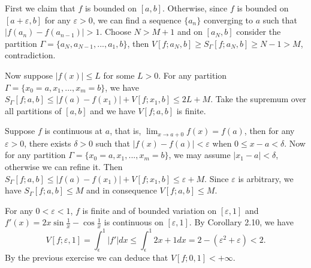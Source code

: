 \begin{exercise}{2.5}
  First we claim that $f$ is bounded on $[a,b]$.
  Otherwise, since $f$ is bounded on $[a+\varepsilon,b]$ for any $\varepsilon>0$,
  we can find a sequence $\{a_n\}$ converging to $a$ such that $|f(a_n)-f(a_{n-1})|>1$.
  Choose $N>M+1$ and on $[a_N,b]$ consider the partition $\Gamma=\{a_N,a_{N-1},...,a_1,b\}$,
  then $V[f;a_N,b]\geq S_{\Gamma}[f;a_N,b]\geq N-1>M$, contradiction.

  Now suppose $|f(x)|\leq L$ for some $L>0$.
  For any partition $\Gamma=\{x_0=a,x_1,...,x_m=b\}$,
  we have $S_{\Gamma}[f;a,b]\leq |f(a)-f(x_1)|+V[f;x_1,b]\leq 2L+M$.
  Take the supremum over all partitions of $[a,b]$ and we have $V[f;a,b]$ is finite.

  Suppose $f$ is continuous at $a$, that is, $\lim_{x\rightarrow{a+0}}f(x)=f(a)$,
  then for any $\varepsilon>0$,
  there exists $\delta>0$ such that $|f(x)-f(a)|<\varepsilon$ when $0\leq x-a<\delta$.
  Now for any partition $\Gamma=\{x_0=a,x_1,...,x_m=b\}$,
  we may assume $|x_1-a|<\delta$, otherwise we can refine it.
  Then $S_{\Gamma}[f;a,b]\leq |f(a)-f(x_1)|+V[f;x_1,b]\leq\varepsilon+M$.
  Since $\varepsilon$ is arbitrary,
  we have $S_{\Gamma}[f;a,b]\leq M$ and in consequence $V[f;a,b]\leq M.$
\end{exercise}

\begin{exercise}{2.6}
  For any $0<\varepsilon<1$,
  $f$ is finite and of bounded variation on $[\varepsilon,1]$
  and $f'(x)=2x\sin{\frac{1}{x}}-\cos{\frac{1}{x}}$ is continuous on $[\varepsilon,1]$.
  By Corollary 2.10,
  we have
  \[
    V[f;\varepsilon,1]=\int_{\epsilon}^1|f'|dx\leq\int_{\epsilon}^1 2x+1 dx=2-(\varepsilon^2+\varepsilon)<2.
  \]
  By the previous exercise we can deduce that $V[f;0,1]<+\infty.$
\end{exercise}

